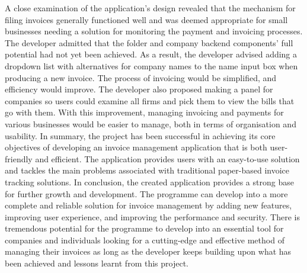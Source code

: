 \newline \newline
A close examination of the application's design revealed that the mechanism for filing invoices generally functioned well and was deemed appropriate for small businesses needing a solution for monitoring the payment and invoicing processes. The developer admitted that the folder and company backend components' full potential had not yet been achieved. As a result, the developer advised adding a dropdown list with alternatives for company names to the name input box when producing a new invoice. The process of invoicing would be simplified, and efficiency would improve. The developer also proposed making a panel for companies so users could examine all firms and pick them to view the bills that go with them. With this improvement, managing invoicing and payments for various businesses would be easier to manage, both in terms of organisation and usability.
\newline \newline
In summary, the project has been successful in achieving its core objectives of developing an invoice management application that is both user-friendly and efficient. The application provides users with an easy-to-use solution and tackles the main problems associated with traditional paper-based invoice tracking solutions. 
\newline \newline
In conclusion, the created application provides a strong base for further growth and development. The programme can develop into a more complete and reliable solution for invoice management by adding new features, improving user experience, and improving the performance and security. There is tremendous potential for the programme to develop into an essential tool for companies and individuals looking for a cutting-edge and effective method of managing their invoices as long as the developer keeps building upon what has been achieved and lessons learnt from this project.
